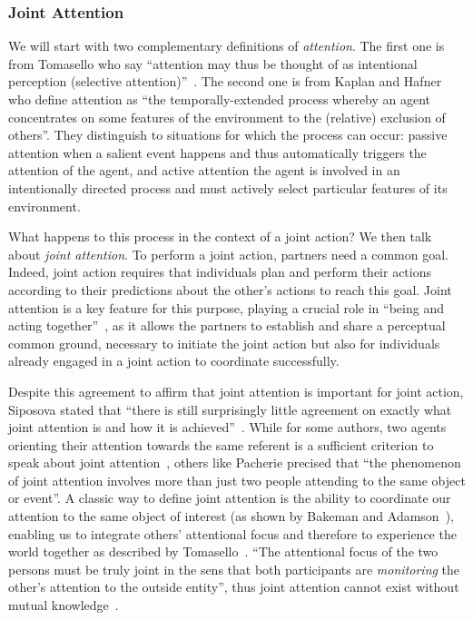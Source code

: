 \documentclass[a4paper,11pt,twoside]{StyleThese}
\begin{document}
\subsubsection{Joint Attention}\label{chap1:subsubsec:joint_att}
We will start with two complementary definitions of \textit{attention}. The first one is from Tomasello \etal{} who say ``attention may thus be thought of as intentional perception (selective attention)''~\cite{tomasello_2005_understanding}. The second one is from Kaplan and Hafner~\cite{kaplan_2006_challenges} who define attention as ``the temporally-extended process whereby an agent concentrates on some features of the environment to the (relative) exclusion of others''. They distinguish to situations for which the process can occur: passive attention when a salient event happens and thus automatically triggers the attention of the agent, and active attention the agent is involved in an
intentionally directed process and must actively select particular features of its environment. 

What happens to this process in the context of a joint action? We then talk about \textit{joint attention}. To perform a joint action, partners need a common goal. Indeed, joint action requires that individuals plan and perform their actions according to their predictions about the other’s actions to reach this goal. Joint attention is a key feature for this purpose, playing a crucial role in ``being and acting together''~\cite{tomasello_2009_cultural}, as it allows the partners to establish and share a perceptual common ground, necessary to initiate the joint action but also for individuals already engaged in a joint action to coordinate successfully. 

Despite this agreement to affirm that joint attention is important for joint action, Siposova stated that ``there is still surprisingly little agreement on exactly what joint attention is and how it is achieved''~\cite{siposova_2019_new}. While for some authors, two agents orienting their attention towards the same referent is a sufficient criterion to speak about joint attention~\cite{butterworth_1991_minds}, others like Pacherie precised that ``the phenomenon of joint attention involves more than just two people attending to the same object or event''. A classic way to define joint attention is the ability to coordinate our attention to the same object of interest (\eg as shown by Bakeman and Adamson~\cite{bakeman_1984_coordinating}), enabling us to integrate others’ attentional focus and therefore to experience the world together as described by Tomasello~\cite{tomasello_2009_cultural}.  ``The attentional focus of the two persons must be truly joint in the sens that both participants are \textit{monitoring} the other's attention to the outside entity'', thus joint attention cannot exist without mutual knowledge~\cite[p.~106]{tomasello_1995_joint}.
\end{document}
